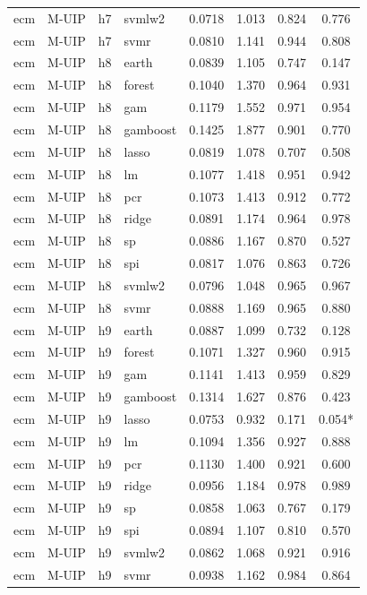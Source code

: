 \begin{ThreePartTable}
\begin{longtable}[t]{llclcccc}
ecm & M-UIP & h7 & svmlw2 & 0.0718 & 1.013 & 0.824 & 0.776\\
ecm & M-UIP & h7 & svmr & 0.0810 & 1.141 & 0.944 & 0.808\\
\addlinespace
ecm & M-UIP & h8 & earth & 0.0839 & 1.105 & 0.747 & 0.147\\
ecm & M-UIP & h8 & forest & 0.1040 & 1.370 & 0.964 & 0.931\\
ecm & M-UIP & h8 & gam & 0.1179 & 1.552 & 0.971 & 0.954\\
ecm & M-UIP & h8 & gamboost & 0.1425 & 1.877 & 0.901 & 0.770\\
ecm & M-UIP & h8 & lasso & 0.0819 & 1.078 & 0.707 & 0.508\\
ecm & M-UIP & h8 & lm & 0.1077 & 1.418 & 0.951 & 0.942\\
ecm & M-UIP & h8 & pcr & 0.1073 & 1.413 & 0.912 & 0.772\\
ecm & M-UIP & h8 & ridge & 0.0891 & 1.174 & 0.964 & 0.978\\
ecm & M-UIP & h8 & sp & 0.0886 & 1.167 & 0.870 & 0.527\\
ecm & M-UIP & h8 & spi & 0.0817 & 1.076 & 0.863 & 0.726\\
ecm & M-UIP & h8 & svmlw2 & 0.0796 & 1.048 & 0.965 & 0.967\\
ecm & M-UIP & h8 & svmr & 0.0888 & 1.169 & 0.965 & 0.880\\
\addlinespace
ecm & M-UIP & h9 & earth & 0.0887 & 1.099 & 0.732 & 0.128\\
ecm & M-UIP & h9 & forest & 0.1071 & 1.327 & 0.960 & 0.915\\
ecm & M-UIP & h9 & gam & 0.1141 & 1.413 & 0.959 & 0.829\\
ecm & M-UIP & h9 & gamboost & 0.1314 & 1.627 & 0.876 & 0.423\\
ecm & M-UIP & h9 & lasso & 0.0753 & 0.932 & 0.171 & 0.054*\\
ecm & M-UIP & h9 & lm & 0.1094 & 1.356 & 0.927 & 0.888\\
ecm & M-UIP & h9 & pcr & 0.1130 & 1.400 & 0.921 & 0.600\\
ecm & M-UIP & h9 & ridge & 0.0956 & 1.184 & 0.978 & 0.989\\
ecm & M-UIP & h9 & sp & 0.0858 & 1.063 & 0.767 & 0.179\\
ecm & M-UIP & h9 & spi & 0.0894 & 1.107 & 0.810 & 0.570\\
ecm & M-UIP & h9 & svmlw2 & 0.0862 & 1.068 & 0.921 & 0.916\\
ecm & M-UIP & h9 & svmr & 0.0938 & 1.162 & 0.984 & 0.864\\

\end{longtable}
\end{ThreePartTable}
